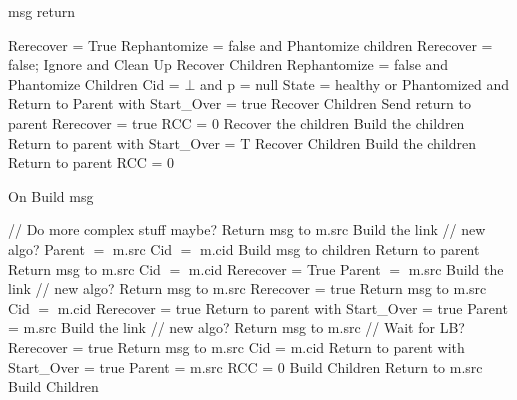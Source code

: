 \documentclass{article}
\begin{document}
\begin{algorithm}
\caption{msg return}
\label{ build or recoveryDone message received}
\begin{algorithmic}[1]
				\State Rerecover = True
			\EndIf
				\State Rephantomize = false and Phantomize children
				\State Rerecover = false;
					\State Ignore and Clean Up
				\Else
					\State Recover Children
				\EndIf
			\EndIf
		\Else
				\State Rephantomize = false and Phantomize Children
				\State Cid = $\bot$ and p = null
				\State State = healthy or Phantomized and  Return to Parent with Start\_Over = true
				\State Recover Children
			\Else
				\State Send return to parent
			\EndIf
		\EndIf
				\State Rerecover = true
			\EndIf
					\State RCC = 0
					\State Recover the children
				\Else
					\State Build the children
				\EndIf
			\EndIf
		\Else
				\State Return to parent with Start\_Over = T
					\State Recover Children
				\Else
					\State Build the children
				\EndIf
			\Else
				\State Return to parent
				\State RCC = 0
			\EndIf
		\EndIf
	\EndIf
\EndIf
\EndProcedure
\end{algorithmic}
\end{algorithm}	


	
\begin{algorithm}
\caption{On Build msg}
\label{Build message received}
\begin{algorithmic}[1]
  // Do more complex stuff maybe?
	\State Return msg to m.src
	\State Build the link // new algo?
	\State Parent $=$ m.src
	\State Cid $=$ m.cid
		\State Build msg to children
	\Else
		\State Return to parent
	\EndIf
{}
	\State Return msg to m.src
			\State Cid $=$ m.cid
			\State Rerecover = True
			\State Parent $=$ m.src
			\State Build the link // new algo?
			\State Return msg to m.src
		\Else
			\State Rerecover = true
			\State Return msg to m.src
		\EndIf
	\Else
			\State Cid $=$ m.cid
			\State Rerecover = true
			\State Return to parent with Start\_Over = true
			\State Parent = m.src
			\State Build the link // new algo?
			\State Return msg to m.src
		\Else
      // Wait for LB?
			\State Rerecover = true
			\State Return msg to m.src
		\EndIf
	\EndIf
{}
		\State Cid = m.cid
		\State Return to parent with Start\_Over = true
		\State Parent = m.src
		\State RCC = 0
		\State Build Children
	\Else
		\State Return to m.src
		\State Build Children
	\EndIf
\EndIf
\EndProcedure
\end{algorithmic}
\end{algorithm}	
\end{document}

